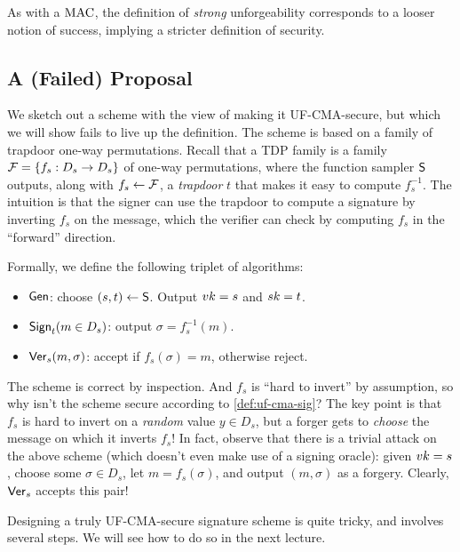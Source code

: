 \documentclass[11pt]{article}
\begin{document}
As with a $\text{MAC}$, the definition of \emph{strong} unforgeability
corresponds to a looser notion of success, implying a stricter
definition of security.

\subsection{A (Failed) Proposal}
\label{sec:failed-proposal}

We sketch out a scheme with the view of making it UF-CMA-secure, but
which we will show fails to live up the definition.  The scheme is
based on a family of trapdoor one-way permutations.  Recall that a TDP
family is a family $\mathcal{F} = \{f_{s} : D_{s} \to D_{s}\}$ of one-way
permutations, where the function sampler $\mathsf{S}$ outputs, along
with $f_{s} \gets \mathcal{F}$, a \emph{trapdoor} $t$ that makes it easy to
compute $f_{s}^{-1}$.  The intuition is that the signer can use the
trapdoor to compute a signature by inverting $f_{s}$ on the message,
which the verifier can check by computing $f_{s}$ in the ``forward''
direction.

Formally, we define the following triplet of algorithms:
\begin{itemize}
\item $\mathsf{Gen}$: choose $(s,t) \gets \mathsf{S}$.  Output $vk = s$ and
  $sk = t$. 
\item $\mathsf{Sign}_{t} (m \in D_{s})$: output $\sigma = f_{s}^{-1}(m)$.
\item $\mathsf{Ver}_{s}(m , \sigma)$: accept if $f_{s}(\sigma) = m$,
  otherwise reject.
\end{itemize}

The scheme is correct by inspection.  And $f_{s}$ is ``hard to
invert'' by assumption, so why isn't the scheme secure according to
\cref{def:uf-cma-sig}?  The key point is that $f_{s}$ is
hard to invert on a \emph{random} value $y \in D_{s}$, but a forger
gets to \emph{choose} the message on which it inverts $f_{s}$!  In
fact, observe that there is a trivial attack on the above scheme
(which doesn't even make use of a signing oracle): given $vk = s$,
choose some $\sigma \in D_{s}$, let $m = f_{s}(\sigma)$, and output
$(m,\sigma)$ as a forgery.  Clearly, $\mathsf{Ver}_{s}$ accepts this pair!

Designing a truly UF-CMA-secure signature scheme is quite tricky, and
involves several steps.  We will see how to do so in the next lecture.
\end{document}
